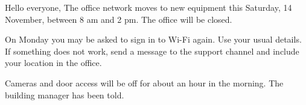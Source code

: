 \documentclass{jupiter-letter}
\begin{document}
\begin{jpletter}{Hello everyone,}
The office network moves to new equipment this Saturday, 14 November, between 8 am and 2 pm. The office will be closed.

On Monday you may be asked to sign in to Wi-Fi again. Use your usual details. If something does not work, send a message to the support channel and include your location in the office.

Cameras and door access will be off for about an hour in the morning. The building manager has been told.
\end{jpletter}
\end{document}
